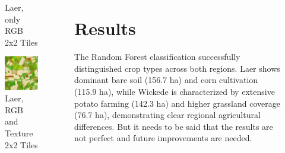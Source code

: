 \documentclass[
  t,%
]{_style/tudelft-beamerposter}
\begin{document}
\begin{frame}
\begin{columns}[onlytextwidth, T]
\begin{column}{}
\begin{figure}[h!]
\begin{minipage}{.5\textwidth}
                \caption{Laer, only RGB 2x2 Tiles}
                \label{fig:enter-label}
            \end{minipage}%
            \begin{minipage}{.5\textwidth}
                \centering
                \includegraphics[scale=0.45]{graphs/textureAndColour2x2laer.png}
                \caption{Laer, RGB and Texture 2x2 Tiles}
                \label{fig:enter-label}
            \end{minipage}%
        \end{figure}

    \end{column}
    \begin{column}{}
      \section*{Results}
      \justifying
      The Random Forest classification successfully distinguished crop types across both regions. Laer shows dominant bare soil (156.7 ha) and corn cultivation (115.9 ha), while Wickede is characterized by extensive potato farming (142.3 ha) and higher grassland coverage (76.7 ha), demonstrating clear regional agricultural differences. But it needs to be said that the results are not perfect and future improvements are needed.


\end{column}
\end{columns}
\end{frame}
\end{document}
